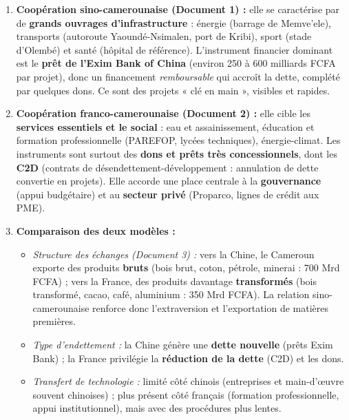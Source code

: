 \documentclass[11pt]{article}
\begin{document}
\begin{corrige}
\begin{enumerate}
\item \textbf{Coopération sino-camerounaise (Document 1) :} elle se caractérise par de \textbf{grands ouvrages d'infrastructure} : énergie (barrage de Memve'ele), transports (autoroute Yaoundé-Nsimalen, port de Kribi), sport (stade d'Olembé) et santé (hôpital de référence). L'instrument financier dominant est le \textbf{prêt de l'Exim Bank of China} (environ 250 à 600 milliards FCFA par projet), donc un financement \emph{remboursable} qui accroît la dette, complété par quelques dons. Ce sont des projets « clé en main », visibles et rapides.
\item \textbf{Coopération franco-camerounaise (Document 2) :} elle cible les \textbf{services essentiels et le social} : eau et assainissement, éducation et formation professionnelle (PAREFOP, lycées techniques), énergie-climat. Les instruments sont surtout des \textbf{dons et prêts très concessionnels}, dont les \textbf{C2D} (contrats de désendettement-développement : annulation de dette convertie en projets). Elle accorde une place centrale à la \textbf{gouvernance} (appui budgétaire) et au \textbf{secteur privé} (Proparco, lignes de crédit aux PME).
\item \textbf{Comparaison des deux modèles :}
\begin{itemize}
\item \emph{Structure des échanges (Document 3) :} vers la Chine, le Cameroun exporte des produits \textbf{bruts} (bois brut, coton, pétrole, minerai : 700 Mrd FCFA) ; vers la France, des produits davantage \textbf{transformés} (bois transformé, cacao, café, aluminium : 350 Mrd FCFA). La relation sino-camerounaise renforce donc l'extraversion et l'exportation de matières premières.
\item \emph{Type d'endettement :} la Chine génère une \textbf{dette nouvelle} (prêts Exim Bank) ; la France privilégie la \textbf{réduction de la dette} (C2D) et les dons.
\item \emph{Transfert de technologie :} limité côté chinois (entreprises et main-d'œuvre souvent chinoises) ; plus présent côté français (formation professionnelle, appui institutionnel), mais avec des procédures plus lentes.
\end{itemize}

\end{enumerate}
\end{corrige}
\end{document}
